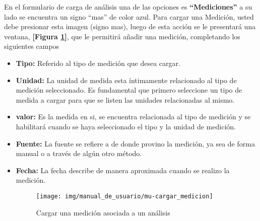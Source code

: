  	En el formulario de carga de análisis una de las opciones es \textbf{``Mediciones''} a su lado se encuentra  un signo ``mas'' de color azul. Para cargar una Medición, usted debe presionar esta imagen (signo mas), luego de esta acción se le presentará una ventana, \textbf{[Figura \ref{mu-cargar_medicion}]}, que le permitirá añadir una medición, completando los siguientes campos
 \begin{itemize}
 	\item \textbf{Tipo: } Referido al tipo de medición que desea cargar.
 	
 	\item \textbf{Unidad: } La unidad de medida esta íntimamente relacionado al tipo de medición seleccionado. Es fundamental que primero seleccione un tipo de medida a cargar para que se listen las unidades relacionadas al mismo.
 	
 	\item \textbf{valor:} Es la medida en si, se encuentra relacionada al tipo de medición y se habilitará cuando se haya seleccionado el tipo y la unidad de medición.
 	\item \textbf{Fuente:} La fuente se refiere a de donde provino la medición, ya sea de forma manual o a través de algún otro método.
 	\item \textbf{Fecha:} La fecha describe de manera aproximada cuando se realizo la medición.
 
 \begin{figure}
 	\centering
 	\texttt{[image: img/manual\_de\_usuario/mu-cargar\_medicion]}
 	\caption{Cargar una medición asociada a un análisis}
 	\label{mu-cargar_medicion}	
 \end{figure}
 	

\end{itemize}
